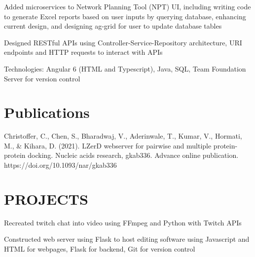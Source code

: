 \documentclass[]{deedy-resume-openfont}
\begin{document}
\begin{minipage}[t]{0.67\textwidth}

\begin{tightemize}
\item Added microservices to Network Planning Tool (NPT) UI, including writing code to generate Excel reports based on user inputs by querying database, enhancing current design, and designing ag-grid for user to update database tables
\item Designed RESTful APIs using Controller-Service-Repository architecture, URI endpoints and HTTP requests to interact with APIs
\item Technologies: Angular 6 (HTML and Typescript), Java, SQL, Team Foundation Server for version control
\end{tightemize}
\sectionsep


\section {Publications}
\begin{tightemize}
\item Christoffer, C., Chen, S., Bharadwaj, V., Aderinwale, T., Kumar, V., Hormati, M., & Kihara, D. (2021). LZerD webserver for pairwise and multiple protein-protein docking. Nucleic acids research, gkab336. Advance online publication. https://doi.org/10.1093/nar/gkab336
\end{tightemize}
\sectionsep


\section {PROJECTS}

\begin{tightemize}
\item Recreated twitch chat into video using FFmpeg and Python with Twitch APIs
\item Constructed web server using Flask to host editing software using Javascript and HTML for webpages, Flask for backend, Git for version control
\end{tightemize}
\sectionsep


\end{minipage}
\end{document}
